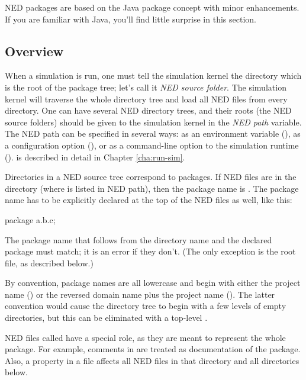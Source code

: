 \begin{note}
    NED packages are based on the Java package concept with minor enhancements.
    If you are familiar with Java, you'll find little surprise in this section.
\end{note}

\subsection{Overview}
\label{sec:ned-lang:packages-overview}

When a simulation is run, one must tell the simulation kernel the directory
which is the root of the package tree; let's call it \textit{NED source folder}.
The simulation kernel will traverse the whole directory tree and load all NED
files from every directory. One can have several NED directory trees, and their
roots (the NED source folders) should be given to the simulation kernel in the
\textit{NED path} variable. The NED path can be specified in several ways: as an
environment variable (), as a configuration option
(), or as a command-line option to the simulation runtime
().  is described in detail in Chapter \ref{cha:run-sim}.

Directories in a NED source tree correspond to packages. If NED files are in the
 directory (where  is listed in NED path), then
the package name is . The package name has to be explicitly declared
at the top of the NED files as well, like this:

\begin{ned}
package a.b.c;
\end{ned}

The package name that follows from the directory name and the declared package
must match; it is an error if they don't. (The only exception is the root
 file, as described below.)

By convention, package names are all lowercase and begin with either the project
name () or the reversed domain name plus the project name
(). The latter convention would cause the directory
tree to begin with a few levels of empty directories, but this can be eliminated
with a top-level .

NED files called  have a special role, as they are meant
to represent the whole package. For example, comments in 
are treated as documentation of the package. Also, a  property
in a  file affects all NED files in that directory and
all directories below.

